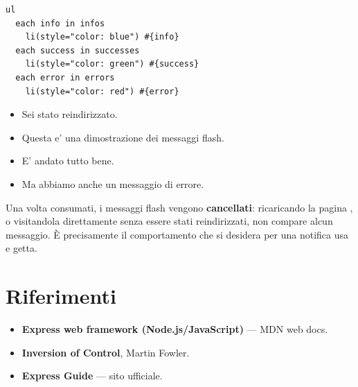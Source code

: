 \begin{affianco}[0.5][c]
\begin{lstlisting}[style=pug, name=views/flash.pug]
ul
  each info in infos
    li(style="color: blue") #{info}
  each success in successes
    li(style="color: green") #{success}
  each error in errors
    li(style="color: red") #{error}
\end{lstlisting}
\risultato
\begin{browser}
  \begin{itemize}[leftmargin=1.8em, itemsep=0pt, topsep=2pt, parsep=0pt]
    \item {\color{css-blue}Sei stato reindirizzato.}
    \item {\color{css-blue}Questa e' una dimostrazione dei messaggi flash.}
    \item {\color{css-green}E' andato tutto bene.}
    \item {\color{css-red}Ma abbiamo anche un messaggio di errore.}
  \end{itemize}
\end{browser}
\end{affianco}

Una volta consumati, i messaggi flash vengono \textbf{cancellati}: ricaricando
la pagina , o visitandola direttamente senza essere stati
reindirizzati, non compare alcun messaggio. È precisamente il comportamento che
si desidera per una notifica \guillemotleft usa e getta\guillemotright.

\section{Riferimenti}

\begin{itemize}
  \item \textbf{Express web framework (Node.js/JavaScript)} --- MDN web docs. \\
  \item \textbf{Inversion of Control}, Martin Fowler. \\
  \item \textbf{Express Guide} --- sito ufficiale. \\
         \\
         \\
         \\
         \\
\end{itemize}
